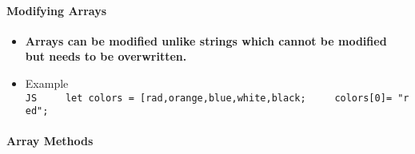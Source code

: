 \documentclass[
  paper=a4,
  ,captions=tableheading
]{scrartcl}
\providecommand{\tightlist}{%
  \setlength{\itemsep}{0pt}\setlength{\parskip}{0pt}}
\begin{document}
\hypertarget{modifying-arrays}{%
\paragraph{Modifying Arrays}\label{modifying-arrays}}

\begin{itemize}
\tightlist
\item
  \textbf{Arrays can be modified unlike strings which cannot be modified
  but needs to be overwritten.}
\item
  Example
  \texttt{JS\ \ \ \ \ let\ colors\ =\ {[}\textquotesingle{}rad\textquotesingle{},\textquotesingle{}orange\textquotesingle{},\textquotesingle{}blue\textquotesingle{},\textquotesingle{}white\textquotesingle{},\textquotesingle{}black\textquotesingle{}{]};\ \ \ \ \ colors{[}0{]}=\ "red";}
\end{itemize}

\hypertarget{array-methods}{%
\paragraph{Array Methods}\label{array-methods}}
\end{document}
